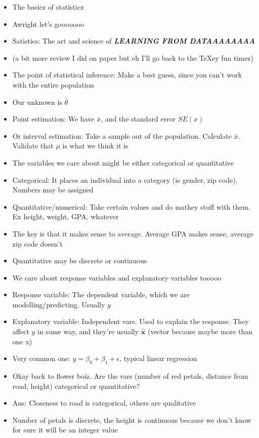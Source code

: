 \documentclass{article}
\begin{document}
  \begin{itemize}
    \item The basicz of statisticz
    \item Awright let's gooooooo
    \item Satistics: The art and science of \textit{ \textbf{ LEARNING FROM DATAAAAAAAA}}
    \item (a bit more review I did on paper but eh I'll go back to the TeXey fun timez)
    \item The point of statistical inference: Make a best guess, since you can't work with the entire population
    \item Our unknown is $ \hat{\theta} $
    \item Point estimation: We have $ \bar{x} $, and the standard error  $ SE(x) $
    \item Or interval estimation: Take a sample out of the population. Calculate  $ \bar{x} $. Validate that  $ \mu $ is what we think it is
    \item The variables we care about might be either categorical or quantitative
    \item Categorical: It places an individual into a category (ie gender, zip code). Numbers may be assigned
    \item Quantitative/numerical: Take certain values and do mathey stuff with them. Ex height, weight, GPA, whatever
    \item The key is that it makes sense to average. Average GPA makes sense, average zip code doesn't
    \item Quantitative may be discrete or continuous
    \item We care about response variables and explanatory variables tooooo
    \item Response variable: The dependent variable, which we are modelling/predicting. Usually $ y $
    \item Explanatory variable: Independent vars. Used to explain the response. They affect  $ y $ in some way, and they're usually  $ \hat{ \textbf{x}} $ (vector because maybe more than one x)
    \item Very common one: $ y = \beta_0 + \beta_1 + \epsilon $, typical linear regression
    \item Okay back to flower boiz.  Are the vars (number of red petals, distance from road, height) categorical or quantitative?
    \item Ans: Closeness to road is categorical, others are qualitative
    \item Number of petals is discrete, the height is continuous because we don't know for sure it will be an integer value

\end{itemize}
\end{document}
